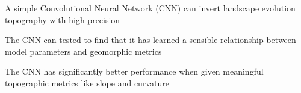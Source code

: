 \documentclass[draft]{agujournal2019}
\begin{document}


\begin{keypoints}
\item A simple Convolutional Neural Network (CNN) can invert landscape evolution topography with high precision
\item The CNN can tested to find that it has learned a sensible relationship between model parameters and geomorphic metrics 
\item The CNN has significantly better performance when given meaningful topographic metrics like slope and curvature
\end{keypoints}

%
%

%
%

\end{document}
